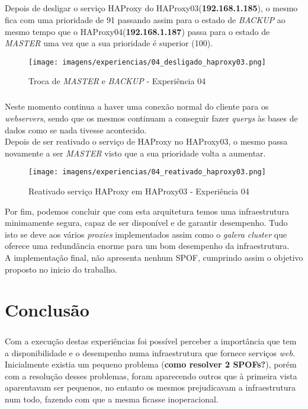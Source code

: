 \documentclass{report}
\begin{document}
\paragraph{}
Depois de desligar o serviço HAProxy do HAProxy03(\textbf{192.168.1.185}), o mesmo fica com uma prioridade de 91 passando assim para o estado de \emph{BACKUP} ao mesmo tempo que o HAProxy04(\textbf{192.168.1.187}) passa para o estado de \emph{MASTER} uma vez que a sua prioridade é superior (100).

\begin{figure}[H]
\center
\texttt{[image: imagens/experiencias/04\_desligado\_haproxy03.png]}
\caption{Troca de \emph{MASTER} e \emph{BACKUP} - Experiência 04}
\label{fig.nav}
\end{figure}

\paragraph{}
Neste momento continua a haver uma conexão normal do cliente para os \emph{webservers}, sendo que os mesmos continuam a conseguir fazer \emph{querys} às bases de dados como se nada tivesse acontecido.\\
Depois de ser reativado o serviço de HAProxy no HAProxy03, o mesmo passa novamente a ser \emph{MASTER} visto que a sua prioridade volta a aumentar.

\begin{figure}[H]
\center
\texttt{[image: imagens/experiencias/04\_reativado\_haproxy03.png]}
\caption{Reativado serviço HAProxy em HAProxy03 - Experiência 04}
\label{fig.nav}
\end{figure}

Por fim, podemos concluir que com esta arquitetura temos uma infraestrutura minimamente segura, capaz de ser disponível e de garantir desempenho. Tudo isto se deve aos vários \emph{proxies} implementados assim como o \emph{galera cluster} que oferece uma redundância enorme para um bom desempenho da infraestrutura.\\
A implementação final, não apresenta nenhum SPOF, cumprindo assim o objetivo proposto no inicio do trabalho.

\chapter{Conclusão}\label{Conclusão}
\paragraph{}
Com a execução destas experiências foi possível perceber a importância que tem a disponibilidade e o desempenho numa infraestrutura que fornece serviços \emph{web}. \\
Inicialmente existia um pequeno problema (\textbf{como resolver 2 SPOFs?}), porém com a resolução desses problemas, foram aparecendo outros que à primeira vista aparentavam ser pequenos, no entanto os mesmos prejudicavam a infraestrutura num todo, fazendo com que a mesma ficasse inoperacional.
\end{document}
